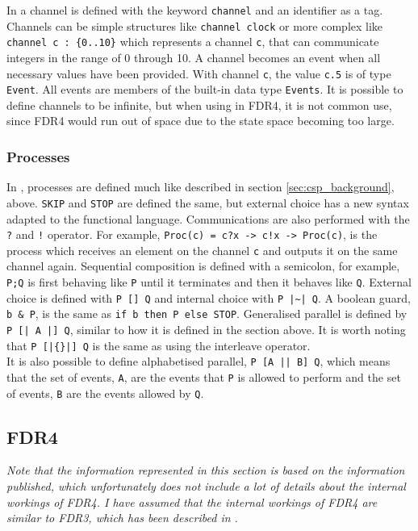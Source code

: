 In \cspm{} a channel is defined with the keyword \texttt{channel} and an identifier as a tag. Channels can be simple structures like \texttt{channel clock} or more complex like \texttt{channel c : \{0..10\}} which represents a channel \texttt{c}, that can communicate integers in the range of 0 through 10. A channel becomes an event when all necessary values have been provided. With channel \texttt{c}, the value \texttt{c.5} is of type \texttt{Event}. All events are members of the built-in data type \texttt{Events}. It is possible to define channels to be infinite, but when using \cspm{} in FDR4, it is not common use, since FDR4 would run out of space due to the state space becoming too large.
\subsubsection{\cspm{} Processes}
In \cspm{}, processes are defined much like described in section \ref{sec:csp_background}, above. \texttt{SKIP} and \texttt{STOP} are defined the same, but external choice has a new syntax adapted to the functional language. Communications are also performed with the \texttt{?} and \texttt{!} operator. For example, \texttt{Proc(c) = c?x -> c!x -> Proc(c)}, is the process which receives an element on the channel \texttt{c} and outputs it on the same channel again.
Sequential composition is defined with a semicolon, for example, \texttt{P;Q} is first behaving like \texttt{P} until it terminates and then it behaves like \texttt{Q}.
External choice is defined with \texttt{P [] Q} and internal choice with \texttt{P |\textasciitilde| Q}. A boolean guard, \texttt{b \& P}, is the same as \texttt{if b then P else STOP}.
Generalised parallel is defined by \texttt{P [| A |] Q}, similar to how it is defined in the section above. It is worth noting that \texttt{P [|\{\}|] Q} is the same as using the interleave operator. \\
It is also possible to define alphabetised parallel, \texttt{P [A || B] Q}, which means that the set of events, \texttt{A}, are the events that \texttt{P} is allowed to perform and the set of events, \texttt{B} are the events allowed by \texttt{Q}.
\subsection{FDR4}
\label{sec:background_fdr}
\textit{Note that the information represented in this section is based on the information published, which unfortunately does not include a lot of details about the internal workings of FDR4. I have assumed that the internal workings of FDR4 are similar to FDR3, which has been described in \cite{fdr}.}\\

